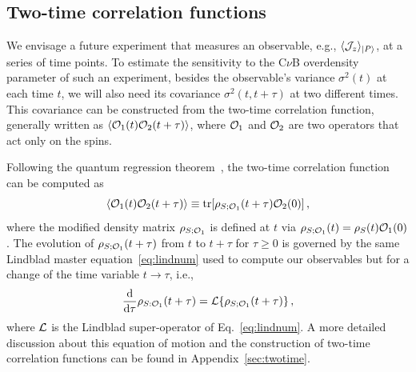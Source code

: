 \documentclass[aps,prd,10pt,twocolumn,superscriptaddress,floatfix,nofootinbib,amsmath,amssymb,altaffilletter,preprintnumbers]{revtex4-1}
\begin{document}

\subsection{Two-time correlation functions}
\label{sec:twotimemain}

We envisage a future experiment that measures an observable, e.g., $\langle{\cal J}_z \rangle_{|P\rangle}$, at a series of time points.  To estimate the sensitivity to the C$\nu$B overdensity parameter of such an experiment, besides the observable's variance $\sigma^2(t)$ at each time $t$, we will also need its covariance $\sigma^2(t,t+\tau)$ at two different times.  This covariance can be constructed from the two-time correlation function, generally written as
 $\langle {\cal O}_1(t) {\cal O}_2(t+\tau)\rangle$, where ${\cal O}_1$ and ${\cal O}_2$ are two operators that act only on the spins.  
 
 Following the quantum regression theorem~\cite{QRT}, the two-time correlation function can be computed as
\begin{equation}
\langle {\cal O}_1(t) {\cal O}_2(t+\tau) \rangle \equiv {\rm tr}[\rho_{S;{\cal O}_1}(t+\tau) {\cal O}_2(0)]\, ,
\end{equation}
where the modified density matrix $\rho_{S;{\cal O}_1}$ is defined at $t$ via $\rho_{S;{\cal O}_1}(t) = \rho_S(t) {\cal O}_1(0)$.  The evolution of $\rho_{S;{\cal O}_1}(t+\tau)$ from $t$ to $t+\tau$  for $\tau \geq 0$ is governed by  the same Lindblad master equation~\eqref{eq:lindnum} used to compute our observables but for a change of the time variable $t \to \tau$, i.e.,
\begin{equation}
 \frac{{\rm d}}{{\rm d} \tau} \rho_{S:{\cal O}_1} (t+\tau)  = {\cal L}\{\rho_{S;{\cal O}_1}(t+\tau) \}\, ,  
 \label{eq:lindcorr}
\end{equation}
where ${\cal L}$ is the Lindblad super-operator of Eq.~\eqref{eq:lindnum}.
A more detailed discussion about this equation of motion and the construction of two-time correlation functions can be found in Appendix~\ref{sec:twotime}.
\end{document}
